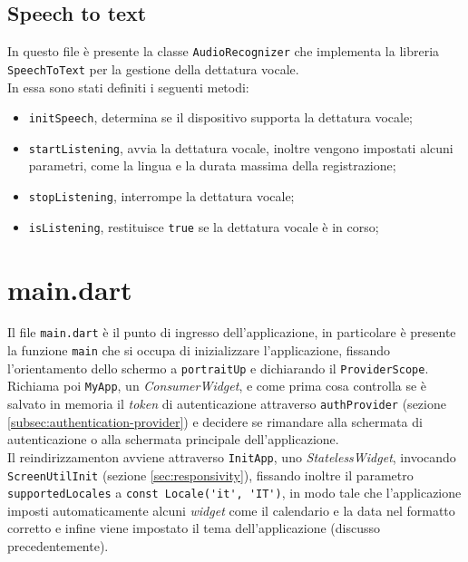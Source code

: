 \subsection{Speech to text}
\label{subsec:speech-to-text}

In questo file è presente la classe \lstinline{AudioRecognizer} che implementa la libreria \lstinline{SpeechToText}\cite{site:speech-to-text} per la gestione della dettatura vocale. \\
In essa sono stati definiti i seguenti metodi:
\begin{itemize}
    \item \lstinline{initSpeech}, determina se il dispositivo supporta la dettatura vocale;
    \item \lstinline{startListening}, avvia la dettatura vocale, inoltre vengono impostati alcuni parametri, come la lingua e la durata massima della registrazione;
    \item \lstinline{stopListening}, interrompe la dettatura vocale;
    \item \lstinline{isListening}, restituisce \lstinline{true} se la dettatura vocale è in corso;
\end{itemize}

\section{main.dart}
\label{sec:main}

Il file \lstinline{main.dart} è il punto di ingresso dell'applicazione, in particolare è presente la funzione \lstinline{main} che si occupa di inizializzare l'applicazione, fissando l'orientamento dello schermo a \lstinline{portraitUp} e dichiarando il \lstinline{ProviderScope}. \\
Richiama poi \lstinline{MyApp}, un \emph{ConsumerWidget}, e come prima cosa controlla se è salvato in memoria il \emph{token} di autenticazione attraverso \lstinline{authProvider} (sezione \ref{subsec:authentication-provider}) e decidere se rimandare alla schermata di autenticazione o alla schermata principale dell'applicazione. \\
Il reindirizzamenton avviene attraverso \lstinline{InitApp}, uno \emph{StatelessWidget}, invocando \lstinline{ScreenUtilInit} (sezione \ref{sec:responsivity}), fissando inoltre il parametro \lstinline{supportedLocales} a \lstinline{const Locale('it', 'IT')}, in modo tale che l'applicazione imposti automaticamente alcuni \emph{widget} come il calendario e la data nel formatto corretto e infine viene impostato il tema dell'applicazione (discusso precedentemente).

